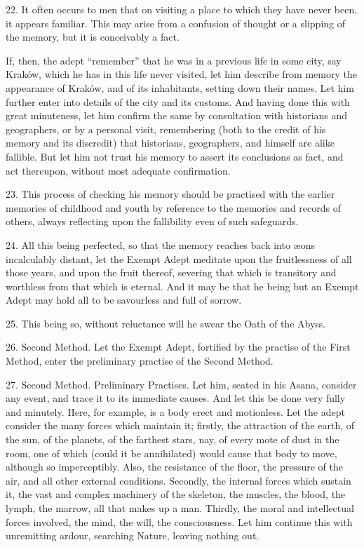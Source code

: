 22. It often occurs to men that on visiting a place to which they have never been, it appears familiar. This may arise from a confusion of thought or a slipping of the memory, but it is conceivably a fact.

If, then, the adept \enquote{remember} that he was in a previous life in some city, say Krak\'{o}w, which he has in this life never visited, let him describe from memory the appearance of Krak\'{o}w, and of its inhabitants, setting down their names. Let him further enter into details of the city and its customs. And having done this with great minuteness, let him confirm the same by consultation with historians and geographers, or by a personal visit, remembering (both to the credit of his memory and its discredit) that historians, geographers, and himself are alike fallible. But let him not trust his memory to assert its conclusions as fact, and act thereupon, without most adequate confirmation. 

23. This process of checking his memory should be practised with the earlier memories of childhood and youth by reference to the memories and records of others, always reflecting upon the fallibility even of such safeguards.

24. All this being perfected, so that the memory reaches back into \ae{}ons incalculably distant, let the Exempt Adept meditate upon the fruitlessness of all those years, and upon the fruit thereof, severing that which is transitory and worthless from that which is eternal. And it may be that he being but an Exempt Adept may hold all to be savourless and full of sorrow.

25. This being so, without reluctance will he swear the Oath of the Abyss.

26. Second Method. Let the Exempt Adept, fortified by the practise of the First Method, enter the preliminary practise of the Second Method.

27. Second Method. Preliminary Practises. Let him, seated in his Asana, consider any event, and trace it to its immediate causes. And let this be done very fully and minutely. Here, for example, is a body erect and motionless. Let the adept consider the many forces which maintain it; firstly, the attraction of the earth, of the sun, of the planets, of the farthest stars, nay, of every mote of dust in the room, one of which (could it be annihilated) would cause that body to move, although so imperceptibly. Also, the resistance of the floor, the pressure of the air, and all other external conditions. Secondly, the internal forces which sustain it, the vast and complex machinery of the skeleton, the muscles, the blood, the lymph, the marrow, all that makes up a man. Thirdly, the moral and intellectual forces involved, the mind, the will, the consciousness. Let him continue this with unremitting ardour, searching Nature, leaving nothing out.

